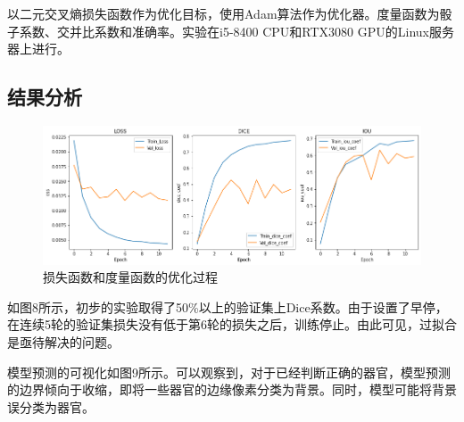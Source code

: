 \documentclass[letterpaper, 10pt, conference, twoside]{ieeeconf}
\begin{document}
以二元交叉熵损失函数作为优化目标，使用Adam算法作为优化器。度量函数为骰子系数、交并比系数和准确率。实验在i5-8400 CPU和RTX3080 GPU的Linux服务器上进行。

\subsection{结果分析}

\begin{figure}[htbp]
  \centering
  \includegraphics[width = 1\linewidth]{metric_result.png}
  \caption{损失函数和度量函数的优化过程}
  \label{fig:fig8}
\end{figure}

如图8所示，初步的实验取得了50\%以上的验证集上Dice系数。由于设置了早停，在连续5轮的验证集损失没有低于第6轮的损失之后，训练停止。由此可见，过拟合是亟待解决的问题。

模型预测的可视化如图9所示。可以观察到，对于已经判断正确的器官，模型预测的边界倾向于收缩，即将一些器官的边缘像素分类为背景。同时，模型可能将背景误分类为器官。
\end{document}
